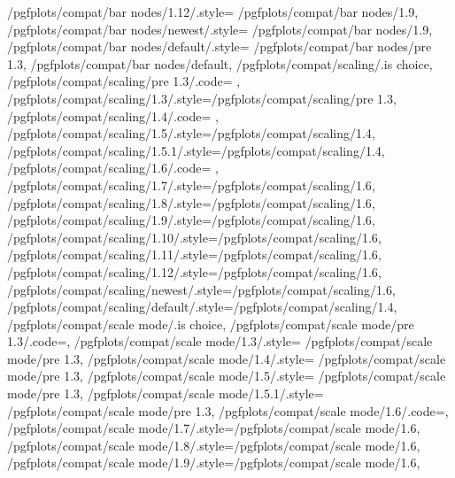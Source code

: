 {	/pgfplots/compat/bar nodes/1.12/.style=		{/pgfplots/compat/bar nodes/1.9},%
	/pgfplots/compat/bar nodes/newest/.style=	{/pgfplots/compat/bar nodes/1.9},%
	/pgfplots/compat/bar nodes/default/.style=	{/pgfplots/compat/bar nodes/pre 1.3},%
	/pgfplots/compat/bar nodes/default,
	/pgfplots/compat/scaling/.is choice,
	/pgfplots/compat/scaling/pre 1.3/.code={%
		\def\pgfplots@compat@scaling@zunitfix@enable{0}%
		\def\pgfplots@compat@scaling@coordmath{pgfbasic}%
		\def\pgfplots@compat@scaling@coordmath@final{pgfbasic}%
	},
	/pgfplots/compat/scaling/1.3/.style={/pgfplots/compat/scaling/pre 1.3},
	/pgfplots/compat/scaling/1.4/.code={%
		\def\pgfplots@compat@scaling@zunitfix@enable{1}%
		\def\pgfplots@compat@scaling@coordmath{float}%
		\def\pgfplots@compat@scaling@coordmath@final{pgfbasic}%
	},
	/pgfplots/compat/scaling/1.5/.style={/pgfplots/compat/scaling/1.4},
	/pgfplots/compat/scaling/1.5.1/.style={/pgfplots/compat/scaling/1.4},
	/pgfplots/compat/scaling/1.6/.code={%
		\def\pgfplots@compat@scaling@zunitfix@enable{1}%
		\def\pgfplots@compat@scaling@coordmath{float}%
		\def\pgfplots@compat@scaling@coordmath@final{float}%
	},
	/pgfplots/compat/scaling/1.7/.style={/pgfplots/compat/scaling/1.6},
	/pgfplots/compat/scaling/1.8/.style={/pgfplots/compat/scaling/1.6},
	/pgfplots/compat/scaling/1.9/.style={/pgfplots/compat/scaling/1.6},
	/pgfplots/compat/scaling/1.10/.style={/pgfplots/compat/scaling/1.6},
	/pgfplots/compat/scaling/1.11/.style={/pgfplots/compat/scaling/1.6},
	/pgfplots/compat/scaling/1.12/.style={/pgfplots/compat/scaling/1.6},
	/pgfplots/compat/scaling/newest/.style={/pgfplots/compat/scaling/1.6},
	/pgfplots/compat/scaling/default/.style={/pgfplots/compat/scaling/1.4},
	/pgfplots/compat/scale mode/.is choice,
	/pgfplots/compat/scale mode/pre 1.3/.code=\def\pgfplots@compat@scale@mode@compatible@mode{1},%
	/pgfplots/compat/scale mode/1.3/.style=		{/pgfplots/compat/scale mode/pre 1.3},
	/pgfplots/compat/scale mode/1.4/.style=		{/pgfplots/compat/scale mode/pre 1.3},
	/pgfplots/compat/scale mode/1.5/.style=	 	{/pgfplots/compat/scale mode/pre 1.3},
	/pgfplots/compat/scale mode/1.5.1/.style=	{/pgfplots/compat/scale mode/pre 1.3},
	/pgfplots/compat/scale mode/1.6/.code=\def\pgfplots@compat@scale@mode@compatible@mode{0},
	/pgfplots/compat/scale mode/1.7/.style={/pgfplots/compat/scale mode/1.6},
	/pgfplots/compat/scale mode/1.8/.style={/pgfplots/compat/scale mode/1.6},
	/pgfplots/compat/scale mode/1.9/.style={/pgfplots/compat/scale mode/1.6},
}
